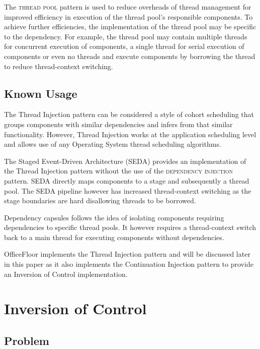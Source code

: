 \documentclass[prodmode]{style/acmlarge}
\begin{document}
The \textsc{thread pool} pattern \cite{thread-per-request} is used to reduce
overheads of thread management for improved efficiency in execution of the
thread pool's responsible components.  To achieve further efficiencies, the
implementation of the thread pool may be specific to the dependency.  For
example, the thread pool may contain multiple threads for concurrent execution
of components, a single thread for serial execution of components or even no
threads and execute components by borrowing the thread to reduce thread-context
switching.


\subsection{Known Usage}

The Thread Injection pattern can be considered a style of cohort scheduling
\cite{cohort} that groups components with similar dependencies and infers from
that similar functionality.  However, Thread Injection works at the application
scheduling level and allows use of any Operating System thread scheduling
algorithms.

The Staged Event-Driven Architecture (SEDA) \cite{seda} provides an
implementation of the Thread Injection pattern without the use of the
\textsc{dependency injection} pattern.  SEDA directly maps components to a stage
and subsequently a thread pool.  The SEDA pipeline however has increased
thread-context switching as the stage boundaries are hard disallowing threads to
be borrowed.

Dependency capsules \cite{dependency-capsules} follows the idea of isolating
components requiring dependencies to specific thread pools.  It however requires
a thread-context switch back to a main thread for executing components without
dependencies.

OfficeFloor \cite{officefloor} implements the Thread Injection pattern and will
be discussed later in this paper as it also implements the Continuation
Injection pattern to provide an Inversion of Control implementation.



\section{Inversion of Control}


\subsection{Problem}
\end{document}

